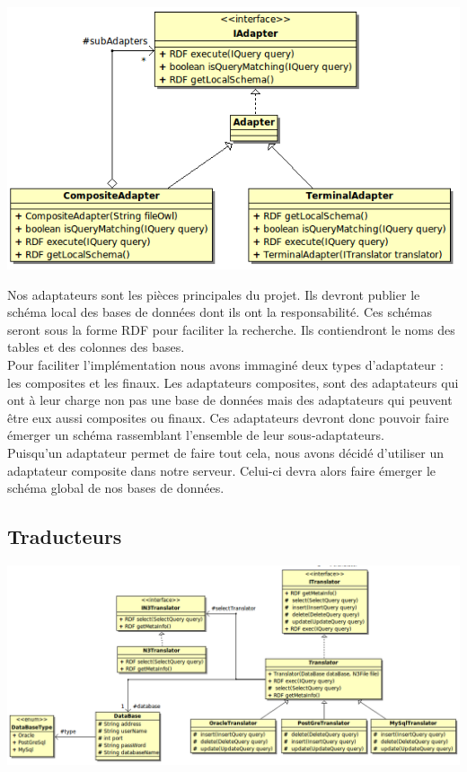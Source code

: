 \documentclass[12pt]{article}
\begin{document}
\begin{center}
	\includegraphics[scale=0.70]{images/Adapter.png}
\end{center}

	Nos adaptateurs sont les pièces principales du projet. Ils devront publier le schéma local des bases de données dont ils ont la responsabilité. Ces schémas seront sous la forme RDF pour faciliter la recherche. Ils contiendront le noms des tables et des colonnes des bases.\\
	\indent Pour faciliter l'implémentation nous avons immaginé deux types d'adaptateur : les composites et les finaux.
	\indent Les adaptateurs composites, sont des adaptateurs qui ont à leur charge non pas une base de données mais des adaptateurs qui peuvent être eux aussi composites ou finaux. Ces adaptateurs devront donc pouvoir faire émerger un schéma rassemblant l'ensemble de leur sous-adaptateurs.\\
	\indent Puisqu'un adaptateur permet de faire tout cela, nous avons décidé d'utiliser un adaptateur composite dans notre serveur. Celui-ci devra alors faire émerger le schéma global de nos bases de données.

\subsection{Traducteurs}

\begin{center}
	\includegraphics[scale=0.50]{images/Translator.png}
\end{center}
\end{document}
